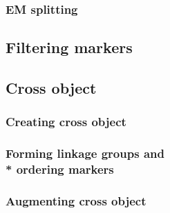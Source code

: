 \documentclass{article}
\begin{document}
\begin{multicols}{2}
\subsubsection{EM splitting}
\blindtext
\subsection{Filtering markers}
\blindtext
\subsection{Cross object}
\blindtext
\subsubsection{Creating cross object}
\blindtext
\subsubsection{Forming linkage groups and \\* ordering markers}
\blindtext
\subsubsection{Augmenting cross object}
\blindtext
\end{multicols}
\newpage
\end{document}

